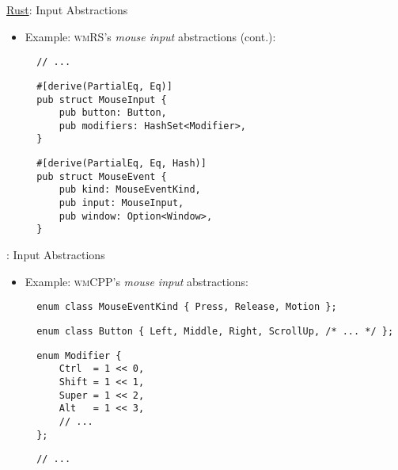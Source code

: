 \begin{frame}[fragile]{\underline{Rust}: Input Abstractions \hfill {\footnotesize \currentname}}


    \begin{itemize}

        \item Example: \textsc{wmRS}'s \textit{mouse input} abstractions (cont.):\\[3pt]
\begin{verbatim}
  // ...
\end{verbatim}
\begin{verbatim}
  #[derive(PartialEq, Eq)]
  pub struct MouseInput {
      pub button: Button,
      pub modifiers: HashSet<Modifier>,
  }
\end{verbatim}
\begin{verbatim}
  #[derive(PartialEq, Eq, Hash)]
  pub struct MouseEvent {
      pub kind: MouseEventKind,
      pub input: MouseInput,
      pub window: Option<Window>,
  }
\end{verbatim}

    \end{itemize}

    \vfill

\end{frame}

\begin{frame}[fragile]{\underline{\cpp}: Input Abstractions \hfill {\footnotesize \currentname}}


    \begin{itemize}

        \item Example: \textsc{wmCPP}'s \textit{mouse input} abstractions:\\[3pt]
\begin{verbatim}
  enum class MouseEventKind { Press, Release, Motion };
\end{verbatim}
\begin{verbatim}
  enum class Button { Left, Middle, Right, ScrollUp, /* ... */ };
\end{verbatim}
\begin{verbatim}
  enum Modifier {
      Ctrl  = 1 << 0,
      Shift = 1 << 1,
      Super = 1 << 2,
      Alt   = 1 << 3,
      // ...
  };
\end{verbatim}
\begin{verbatim}
  // ...
\end{verbatim}

    \end{itemize}

    \vfill

\end{frame}


